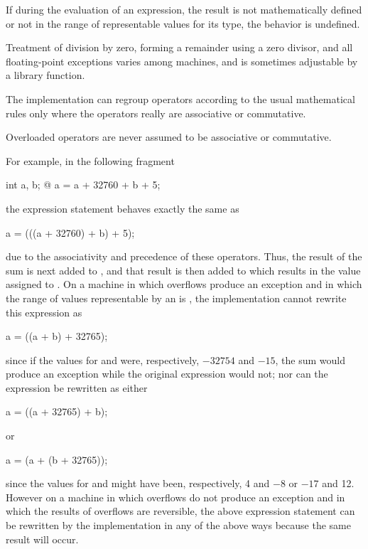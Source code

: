 \pnum
{}%
%
%
%
%
If during the evaluation of an expression, the result is not
mathematically defined or not in the range of representable values for
its type, the behavior is undefined.
\begin{note}
%
Treatment of division by zero, forming a remainder using a zero divisor,
and all floating-point exceptions varies among machines, and is sometimes
adjustable by a library function.
\end{note}

\pnum
{}%
%
\begin{note}
The implementation can regroup operators according to
the usual mathematical rules only
where the operators really are associative or commutative.
\begin{footnote}
Overloaded
operators are never assumed to be associative or commutative.
\end{footnote}
For example, in the following fragment
\begin{codeblock}
int a, b;
@\commentellip@
a = a + 32760 + b + 5;
\end{codeblock}
the expression statement behaves exactly the same as
\begin{codeblock}
a = (((a + 32760) + b) + 5);
\end{codeblock}
due to the associativity and precedence of these operators. Thus, the
result of the sum  is next added to , and
that result is then added to  which results in the value assigned to
. On a machine in which overflows produce an exception and in
which the range of values representable by an  is
, the implementation cannot rewrite this
expression as
\begin{codeblock}
a = ((a + b) + 32765);
\end{codeblock}
since if the values for  and  were, respectively,
$-32754$ and $-15$, the sum  would produce an exception while
the original expression would not; nor can the expression be rewritten
as either
\begin{codeblock}
a = ((a + 32765) + b);
\end{codeblock}
or
\begin{codeblock}
a = (a + (b + 32765));
\end{codeblock}
since the values for  and  might have been,
respectively, 4 and $-8$ or $-17$ and 12. However on a machine in which
overflows do not produce an exception and in which the results of
overflows are reversible, the above expression statement can be
rewritten by the implementation in any of the above ways because the
same result will occur.
\end{note}

